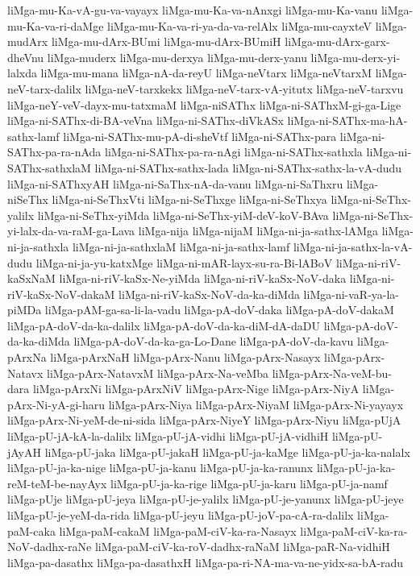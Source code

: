 {liMga-mu-Ka-vA-gu-va-vayayx
liMga-mu-Ka-va-nAnxgi
liMga-mu-Ka-vanu
liMga-mu-Ka-va-ri-daMge
liMga-mu-Ka-va-ri-ya-da-va-relAlx
liMga-mu-cayxteV
liMga-mudArx
liMga-mu-dArx-BUmi
liMga-mu-dArx-BUmiH
liMga-mu-dArx-garx-dheVnu
liMga-muderx
liMga-mu-derxya
liMga-mu-derx-yanu
liMga-mu-derx-yi-lalxda
liMga-mu-mana
liMga-nA-da-reyU
liMga-neVtarx
liMga-neVtarxM
liMga-neV-tarx-dalilx
liMga-neV-tarxkekx
liMga-neV-tarx-vA-yitutx
liMga-neV-tarxvu
liMga-neY-veV-dayx-mu-tatxmaM
liMga-niSAThx
liMga-ni-SAThxM-gi-ga-Lige
liMga-ni-SAThx-di-BA-veVna
liMga-ni-SAThx-diVkASx
liMga-ni-SAThx-ma-hA-sathx-lamf
liMga-ni-SAThx-mu-pA-di-sheVtf
liMga-ni-SAThx-para
liMga-ni-SAThx-pa-ra-nAda
liMga-ni-SAThx-pa-ra-nAgi
liMga-ni-SAThx-sathxla
liMga-ni-SAThx-sathxlaM
liMga-ni-SAThx-sathx-lada
liMga-ni-SAThx-sathx-la-vA-dudu
liMga-ni-SAThxyAH
liMga-ni-SaThx-nA-da-vanu
liMga-ni-SaThxru
liMga-niSeThx
liMga-ni-SeThxVti
liMga-ni-SeThxge
liMga-ni-SeThxya
liMga-ni-SeThx-yalilx
liMga-ni-SeThx-yiMda
liMga-ni-SeThx-yiM-deV-koV-BAva
liMga-ni-SeThx-yi-lalx-da-va-raM-ga-Lava
liMga-nija
liMga-nijaM
liMga-ni-ja-sathx-lAMga
liMga-ni-ja-sathxla
liMga-ni-ja-sathxlaM
liMga-ni-ja-sathx-lamf
liMga-ni-ja-sathx-la-vA-dudu
liMga-ni-ja-yu-katxMge
liMga-ni-mAR-layx-su-ra-Bi-lABoV
liMga-ni-riV-kaSxNaM
liMga-ni-riV-kaSx-Ne-yiMda
liMga-ni-riV-kaSx-NoV-daka
liMga-ni-riV-kaSx-NoV-dakaM
liMga-ni-riV-kaSx-NoV-da-ka-diMda
liMga-ni-vaR-ya-la-piMDa
liMga-pAM-ga-sa-li-la-vadu
liMga-pA-doV-daka
liMga-pA-doV-dakaM
liMga-pA-doV-da-ka-dalilx
liMga-pA-doV-da-ka-diM-dA-daDU
liMga-pA-doV-da-ka-diMda
liMga-pA-doV-da-ka-ga-Lo-Dane
liMga-pA-doV-da-kavu
liMga-pArxNa
liMga-pArxNaH
liMga-pArx-Nanu
liMga-pArx-Nasayx
liMga-pArx-Natavx
liMga-pArx-NatavxM
liMga-pArx-Na-veMba
liMga-pArx-Na-veM-bu-dara
liMga-pArxNi
liMga-pArxNiV
liMga-pArx-Nige
liMga-pArx-NiyA
liMga-pArx-Ni-yA-gi-haru
liMga-pArx-Niya
liMga-pArx-NiyaM
liMga-pArx-Ni-yayayx
liMga-pArx-Ni-yeM-de-ni-sida
liMga-pArx-NiyeY
liMga-pArx-Niyu
liMga-pUjA
liMga-pU-jA-kA-la-dalilx
liMga-pU-jA-vidhi
liMga-pU-jA-vidhiH
liMga-pU-jAyAH
liMga-pU-jaka
liMga-pU-jakaH
liMga-pU-ja-kaMge
liMga-pU-ja-ka-nalalx
liMga-pU-ja-ka-nige
liMga-pU-ja-kanu
liMga-pU-ja-ka-ranunx
liMga-pU-ja-ka-reM-teM-be-nayAyx
liMga-pU-ja-ka-rige
liMga-pU-ja-karu
liMga-pU-ja-namf
liMga-pUje
liMga-pU-jeya
liMga-pU-je-yalilx
liMga-pU-je-yanunx
liMga-pU-jeye
liMga-pU-je-yeM-da-rida
liMga-pU-jeyu
liMga-pU-joV-pa-cA-ra-dalilx
liMga-paM-caka
liMga-paM-cakaM
liMga-paM-ciV-ka-ra-Nasayx
liMga-paM-ciV-ka-ra-NoV-dadhx-raNe
liMga-paM-ciV-ka-roV-dadhx-raNaM
liMga-paR-Na-vidhiH
liMga-pa-dasathx
liMga-pa-dasathxH
liMga-pa-ri-NA-ma-va-ne-yidx-sa-bA-radu
}
